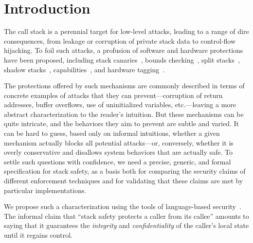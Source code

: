 \documentclass[10pt,conference]{ieeetran}%
\theoremstyle{definition}
\begin{document}
\newcommand{\paragraphx}[1]{\emph{#1.}}

\section{Introduction}

The call stack is a perennial target for low-level attacks, leading to a
range of dire consequences, from leakage or corruption of private stack data
to control-flow hijacking. To foil such attacks, a profusion of
software and hardware protections have been proposed,
%
including stack canaries~\cite{Cowan+98},
bounds checking~\cite{NagarakatteZMZ09,NagarakatteZMZ10,DeviettiBMZ08},
split stacks~\cite{Kuznetsov+14},
shadow stacks~\cite{Dang+15,Shanbhogue+19},
capabilities~\cite{Woodruff+14,Chisnall+15,SkorstengaardLocal,SkorstengaardSTKJFP,Georges+21},
and hardware tagging~\cite{DBLP:conf/sp/RoesslerD18}. 
  \ifaftersubmission{}
\fi

The protections offered by such mechanisms are commonly described in terms
of concrete examples of attacks that they can prevent---corruption of return
addresses, buffer overflows, use of uninitialized variables, etc.---leaving
a more abstract characterization to the reader's intuition.  But these
mechanisms can be quite intricate, and the behaviors they aim to prevent are
subtle and varied.  It can be hard to guess, based only on informal
intuitions, whether a given mechanism actually blocks all potential
attacks---or, conversely, whether it is overly conservative and disallows
system behaviors that are actually safe.
To settle such questions with confidence,
we need a precise, generic, and formal specification for stack
safety, as a basis both for comparing the security claims of different
enforcement techniques and for validating that these claims
are met by particular implementations.

We propose such a characterization using the tools of language-based
security~\cite{sabelfeld2003language}. The informal claim that
``stack safety protects a caller
from its callee'' amounts to saying that it guarantees the {\em integrity} and
{\em confidentiality} of the caller’s local state until it regains control.
\end{document}
